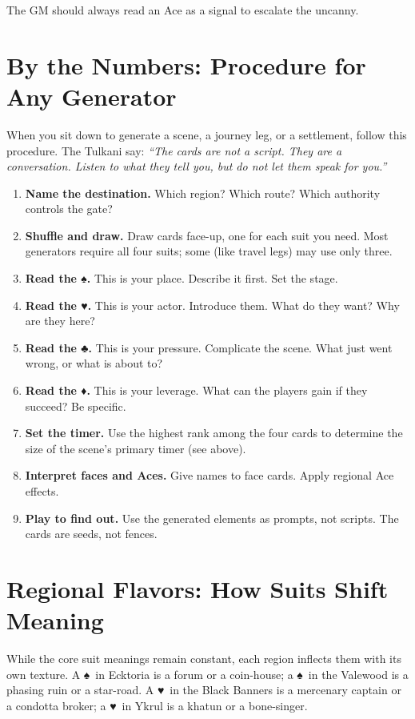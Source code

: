 \documentclass[12pt,oneside]{book}
\renewcommand{\spadesuit}{♠}
\renewcommand{\heartsuit}{♥}
\renewcommand{\clubsuit}{♣}
\renewcommand{\diamondsuit}{♦}
\begin{document}
The GM should always read an Ace as a signal to escalate the uncanny.

\section*{By the Numbers: Procedure for Any Generator}
\label{sec:generator-procedure}

When you sit down to generate a scene, a journey leg, or a settlement, follow this procedure. The Tulkani say: \textit{``The cards are not a script. They are a conversation. Listen to what they tell you, but do not let them speak for you.''}

\begin{enumerate}
    \item \textbf{Name the destination.} Which region? Which route? Which authority controls the gate?
    \item \textbf{Shuffle and draw.} Draw cards face-up, one for each suit you need. Most generators require all four suits; some (like travel legs) may use only three.
    \item \textbf{Read the \spadesuit.} This is your place. Describe it first. Set the stage.
    \item \textbf{Read the \heartsuit.} This is your actor. Introduce them. What do they want? Why are they here?
    \item \textbf{Read the \clubsuit.} This is your pressure. Complicate the scene. What just went wrong, or what is about to?
    \item \textbf{Read the \diamondsuit.} This is your leverage. What can the players gain if they succeed? Be specific.
    \item \textbf{Set the timer.} Use the highest rank among the four cards to determine the size of the scene's primary timer (see above).
    \item \textbf{Interpret faces and Aces.} Give names to face cards. Apply regional Ace effects.
    \item \textbf{Play to find out.} Use the generated elements as prompts, not scripts. The cards are seeds, not fences.
\end{enumerate}

\section*{Regional Flavors: How Suits Shift Meaning}

While the core suit meanings remain constant, each region inflects them with its own texture. A \spadesuit\ in Ecktoria is a forum or a coin-house; a \spadesuit\ in the Valewood is a phasing ruin or a star-road. A \heartsuit\ in the Black Banners is a mercenary captain or a condotta broker; a \heartsuit\ in Ykrul is a khatun or a bone-singer.
\end{document}
